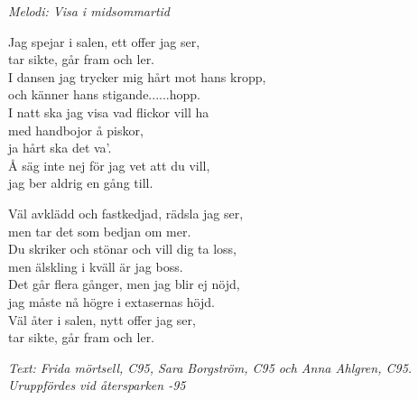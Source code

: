 {\footnotesize\textit{Melodi: Visa i midsommartid}}\par
\vspace{10pt}
Jag spejar i salen, ett offer jag ser,\\
tar sikte, går fram och ler.\\
I dansen jag trycker mig hårt mot hans kropp,\\
och känner hans stigande......hopp.\\
I natt ska jag visa vad flickor vill ha\\
med handbojor å piskor,\\
ja hårt ska det va'.\\
Å säg inte nej för jag vet att du vill,\\
jag ber aldrig en gång till.\par
\vspace{10pt}
Väl avklädd och fastkedjad, rädsla jag ser,\\
men tar det som bedjan om mer.\\
Du skriker och stönar och vill dig ta loss,\\
men älskling i kväll är jag boss.\\
Det går flera gånger, men jag blir ej nöjd,\\
jag måste nå högre i extasernas höjd.\\
Väl åter i salen, nytt offer jag ser,\\
tar sikte, går fram och ler.
\par
\vspace{10pt}
{\footnotesize\textit{Text: Frida mörtsell, C95, Sara Borgström, C95 och Anna Ahlgren, C95. \\
					 Uruppfördes vid återsparken -95}}
